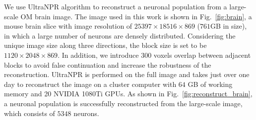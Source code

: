 We use UltraNPR algorithm to reconstruct a neuronal population from a large-scale OM brain image. 
The image used in this work is shown in Fig.~\ref{fig:brain}, a mouse brain slice with image resolution of $25397\times 18516\times 869$ ($761$GB in size), in which a large number of neurons are densely distributed. Considering the unique image size along three directions, the block size is set to be $1120\times 2048\times 869$.  In addition, we introduce $300$ voxels overlap between adjacent blocks to avoid false continuation and increase the robustness of the reconstruction.
UltraNPR is performed on the full image and takes just over one day to reconstruct the image on a cluster computer with $64$ GB of working memory and 20 NVIDIA 1080Ti GPUs.
As shown in Fig.~\ref{fig:reconstruct_brain}, a neuronal population is successfully reconstructed from the large-scale image, which consists of $5348$ neurons.
